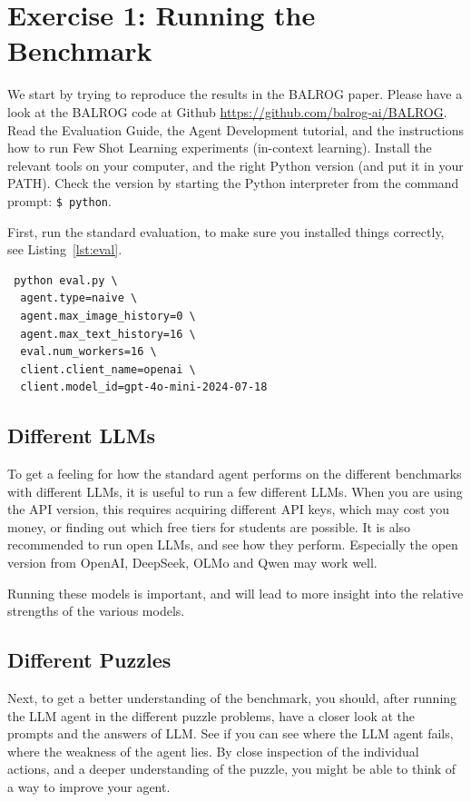 \documentclass[a4]{article}
\begin{document}
\section{Exercise 1: Running the Benchmark}

We start by trying to reproduce the results in the BALROG paper.
Please have a look at the BALROG code at Github \url{https://github.com/balrog-ai/BALROG}. Read the Evaluation Guide, the Agent Development tutorial, and the instructions how to run Few Shot Learning experiments (in-context learning).
Install the relevant tools on your computer, and the right Python version (and put it in your PATH). Check the version by starting the Python interpreter from the command prompt: \verb|$ python|.

First, run the standard evaluation, to make sure you installed things correctly, see Listing~\ref{lst:eval}. 
\begin{listing}
    \begin{verbatim}
 python eval.py \
  agent.type=naive \
  agent.max_image_history=0 \
  agent.max_text_history=16 \
  eval.num_workers=16 \
  client.client_name=openai \
  client.model_id=gpt-4o-mini-2024-07-18       
    \end{verbatim}
    \caption{Running the standard evaluation}\label{lst:eval}
\end{listing}




\subsection{Different LLMs}

To get a feeling for how the standard agent performs on the different benchmarks with different LLMs, it is useful to run a few different LLMs. When you are using the API version, this requires acquiring different API keys, which may cost you money, or finding out which free tiers for students are possible. It is also recommended to run open LLMs, and see how they perform. Especially the open version from OpenAI, DeepSeek, OLMo and Qwen may work  well. 

Running these models is important, and  will lead to more insight into the relative strengths of the various models.

\subsection{Different Puzzles}
Next, to get a better understanding of the benchmark, you should, after running the LLM agent in the different puzzle problems, have a closer look at the prompts and the answers of LLM. See if you can see where the LLM agent fails, where the weakness of the agent lies. By close inspection of the individual actions, and a deeper understanding of the puzzle, you might be able to think of a way to improve your agent.
\end{document}
